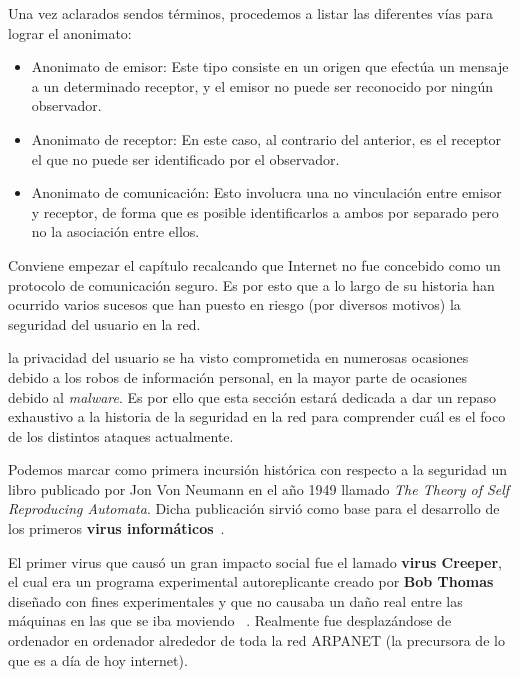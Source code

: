 Una vez aclarados sendos términos, procedemos a listar las diferentes vías para lograr el anonimato:

\begin{itemize}
	\item Anonimato de emisor: Este tipo consiste en un origen que efectúa un mensaje a un determinado receptor, y el emisor no puede ser reconocido por ningún observador.
	\item Anonimato de receptor: En este caso, al contrario del anterior, es el receptor el que no puede ser identificado por el observador.
	\item Anonimato de comunicación: Esto involucra una no vinculación entre emisor y receptor, de forma que es posible identificarlos a ambos por separado pero no la asociación entre ellos.

\end{itemize}

 \label{sec:historia}

Conviene empezar el capítulo recalcando que Internet no fue concebido como un protocolo de comunicación seguro. 
Es por esto que a lo largo de su historia han ocurrido varios sucesos que han puesto en riesgo (por diversos motivos) la seguridad del usuario en la red.

la privacidad del usuario se ha visto comprometida en numerosas ocasiones debido a los robos de información personal, en la mayor parte de ocasiones debido al \textit{malware}. Es por ello que esta sección estará dedicada a dar un repaso exhaustivo a la historia de la seguridad en la red para comprender cuál es el foco de los distintos ataques actualmente.

Podemos marcar como primera incursión histórica con respecto a la seguridad un libro publicado por Jon Von Neumann en el año 1949 llamado \textit{The Theory of Self Reproducing Automata}. Dicha publicación sirvió como  base para el desarrollo de los primeros \textbf{virus informáticos}~\cite{article:automata}.

El primer virus que causó un gran impacto social fue el lamado \textbf{virus Creeper}, el cual era un programa experimental autoreplicante creado por \textbf{Bob Thomas} diseñado con fines experimentales y que no causaba un daño real entre las máquinas en las que se iba moviendo ~\cite{article:motivationvirus}.
Realmente fue desplazándose de ordenador en ordenador alrededor de toda la red ARPANET (la precursora de lo que es a día de hoy internet).


